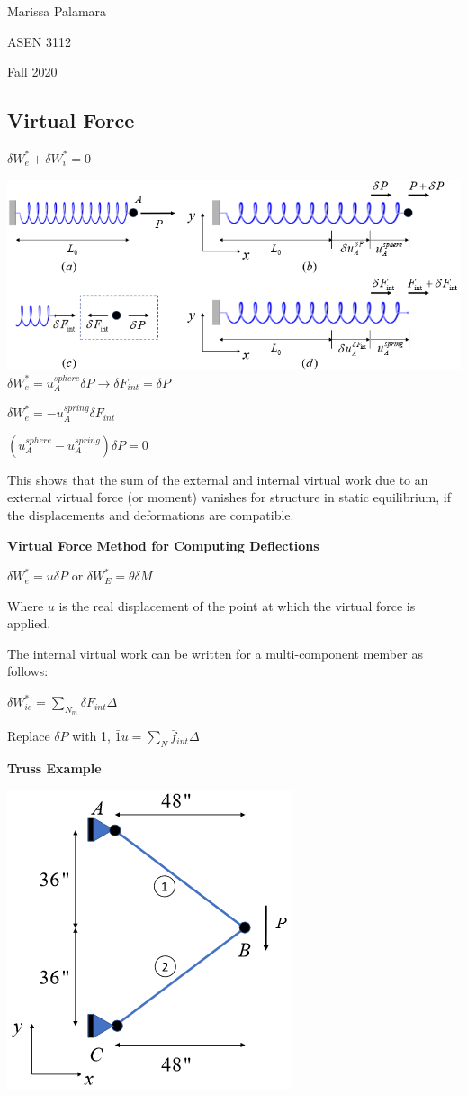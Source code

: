 \documentclass{article}
\begin{document}
\begin{multicols*}{2}
    Marissa Palamara\par 
    ASEN 3112\par 
    Fall 2020
    \vspace{-0.5cm}
    \subsection*{Virtual Force}
    $\delta W_e^*+\delta W_i^*=0$\par 
    \includegraphics[width=0.666\linewidth]{Figures/Virtual_Force_Springs.png}
    $\delta W_e^* = u_A^{sphere} \delta P \rightarrow \delta F_{int}=\delta P$\par 
    $\delta W_e^* = -u_A^{spring} \delta F_{int}$\par 
    $\left(u_A^{sphere}-u_A^{spring}\right)\delta P=0$\par 
    This shows that the sum of the external and internal virtual work due to an 
    external virtual force (or moment) vanishes for structure in static 
    equilibrium, if the displacements and deformations are compatible.

    \textbf{Virtual Force Method for Computing Deflections}\par 
    $\delta W_e^*=u \delta P$ or $\delta W_E^* = \theta \delta M$ \par 
    Where $u$ is the real displacement of the point at which the virtual force
    is applied. \par 
    The internal virtual work can be written for a multi-component member as follows:\par 
    $\delta W_{ie}^*=\sum\limits_{N_m} \delta F_{int} \Delta$\par 
    Replace $\delta P$ with 1, $\bar{1}u=\sum\limits_N \bar{f}_{int}\Delta$

    \textbf{Truss Example}\par 
    \includegraphics[width=0.5\linewidth]{Figures/Truss_Example_VF.png}


\end{multicols*}
\end{document}
